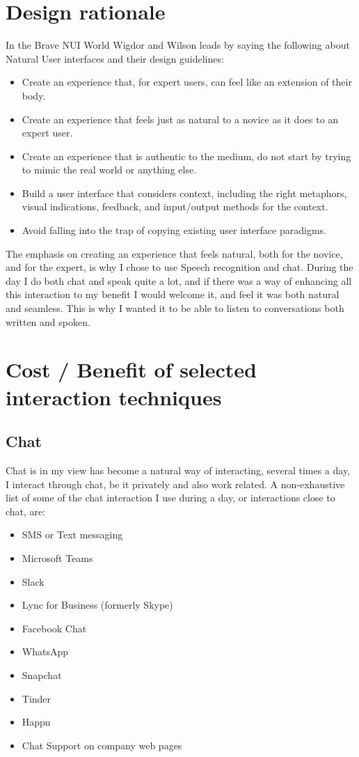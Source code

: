 \documentclass[11pt,fleqn]{book} %
\begin{document}
\section{Design rationale}
In the Brave NUI World\cite{Wigdor2010BraveWorld} Wigdor and Wilson leads by saying the following about Natural User interfaces and their design guidelines:
\begin{itemize}
\item Create an experience that, for expert users, can feel like an extension of their body.
\item Create an experience that feels just as natural to a novice as it does to an
expert user.
\item Create an experience that is authentic to the medium, do not start by trying to
mimic the real world or anything else.
\item Build a user interface that considers context, including the right metaphors,
visual indications, feedback, and input/output methods for the context.
\item Avoid falling into the trap of copying existing user interface paradigms.
\end{itemize}

The emphasis on creating an experience that feels natural, both for the novice, and for the expert, is why I chose to use Speech recognition and chat. During the day I do both chat and speak quite a lot, and if there was a way of enhancing all this interaction to my benefit I would welcome it, and feel it was both natural and seamless.
This is why I wanted it to be able to listen to conversations both written and spoken.

\section{Cost / Benefit of selected interaction techniques}
\subsection{Chat}
Chat is in my view has become a natural way of interacting, several times a day, I interact through chat, be it privately and also work related. A non-exhaustive list of some of the chat interaction I use during a day, or interactions close to chat, are:
\begin{itemize}
\item SMS or Text messaging
\item Microsoft Teams
\item Slack
\item Lync for Business (formerly Skype)
\item Facebook Chat
\item WhatsApp
\item Snapchat 
\item Tinder
\item Happn
\item Chat Support on company web pages
\end{itemize}
\end{document}
